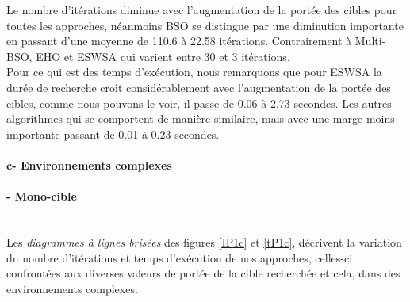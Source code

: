 	Le nombre d'itérations diminue avec l'augmentation de la portée des cibles pour toutes les approches, néanmoins BSO se distingue par une diminution importante en passant d'une moyenne de 110.6 à 22.58 itérations. Contrairement à Multi-BSO, EHO et ESWSA qui varient entre 30 et 3 itérations.\\
	
	Pour ce qui est des temps d'exécution, nous remarquons que pour ESWSA la durée de recherche croît considérablement avec l'augmentation de la portée des cibles, comme nous pouvons le voir, il passe de 0.06 à 2.73 secondes. Les autres algorithmes qui se comportent de manière similaire, mais avec une marge moins importante passant de 0.01 à 0.23 secondes.
	
	
	\noindent
	\hspace{-0.5cm}
	\begin{minipage}[t]{0.55\textwidth}
		\captionsetup{width=0.8\linewidth}
		\centering{}
		\label{IP5o}
	\end{minipage}\hfill
	\hspace{-0.5cm}
	\begin{minipage}[t]{0.55\textwidth}
		\captionsetup{width=0.8\linewidth}
		\centering{}
		\label{tP5o}
	\end{minipage}\hfill
	
	
	\paragraph{c- Environnements complexes}
	\paragraph{- Mono-cible}
	\textbf{ }\\
	Les \textit{diagrammes à lignes brisées} des figures \ref{IP1c} et \ref{tP1c}, décrivent la variation du nombre d'itérations et temps d'exécution de nos approches, celles-ci confrontées aux diverses valeurs de portée de la cible recherchée et cela, dans des environnements complexes.\\
	
